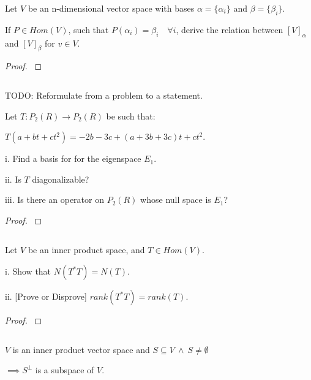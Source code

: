 \documentclass{article}
\newenvironment{customthm}[1]
  {\renewcommand\theinnercustomthm{#1}\innercustomthm}
  {\endinnercustomthm}
\begin{document}
\begin{customthm}{15}[2022.S(2.A)]
  $ $

  Let $V$ be an n-dimensional vector space with bases $\alpha = \{\alpha_i\}$ and $\beta = \{\beta_i\}$.
  
  If $P \in Hom(V)$, such that $P(\alpha_i) = \beta_i \quad \forall i$, derive the relation between $[V]_\alpha$ and $[V]_\beta$ for $v \in V$.
\end{customthm}

\begin{proof}
  $ $

  


\end{proof}
\newpage


\begin{customthm}{16}[2022.S(2.B)]
  $ $

  TODO: Reformulate from a problem to a statement.
  \newline

  Let $T: P_2(R) \rightarrow P_2(R)$ be such that: 

  \qquad $T(a + bt + ct^2) = -2b -3c + (a+3b+3c)t + ct^2$.

  i. Find a basis for for the eigenspace $E_1$.

  ii. Is $T$ diagonalizable?

  iii. Is there an operator on $P_2(R)$ whose null space is $E_1$?
\end{customthm}

\begin{proof}
  $ $

  


\end{proof}
\newpage


\begin{customthm}{17}[2022.S(3.B), 2021.F(3.D)]
  $ $

  Let $V$ be an inner product space, and $T \in Hom(V)$.

  i. Show that $N(T^*T)=N(T)$.

  ii. [Prove or Disprove] $rank(T^*T) = rank(T)$.
\end{customthm}

\begin{proof}
  $ $

  


\end{proof}
\newpage


\begin{customthm}{18}[2021.F(1.A.i)]
  $ $

  $V$ is an inner product vector space and $S \subseteq V \ \land \ S \neq \emptyset$ 
  
  \noindent
  $\implies S^\perp$ is a subspace of $V$.
\end{customthm}
\end{document}
